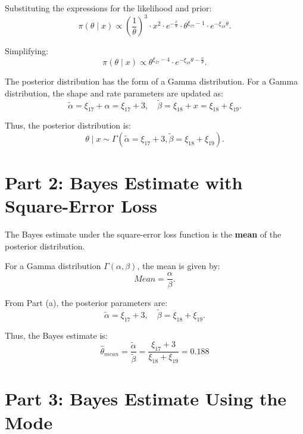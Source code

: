 Substituting the expressions for the likelihood and prior:
\begin{equation}
\pi(\theta \mid x) \propto \left(\frac{1}{\theta}\right)^3 \cdot x^2 \cdot e^{-\frac{x}{\theta}} \cdot \theta^{\xi_{17}-1} \cdot e^{-\xi_{18} \theta}.
\end{equation}

Simplifying:
\begin{equation}
\pi(\theta \mid x) \propto \theta^{\xi_{17} - 4} \cdot e^{-\xi_{18} \theta - \frac{x}{\theta}}.
\end{equation}

The posterior distribution has the form of a Gamma distribution. For a Gamma distribution, the shape and rate parameters are updated as:
\begin{equation}
\tilde{\alpha} = \xi_{17} + \alpha = \xi_{17} + 3, \quad
\tilde{\beta} = \xi_{18} + x = \xi_{18} + \xi_{19}.
\end{equation}

Thus, the posterior distribution is:
\begin{equation}
\theta \mid x \sim \Gamma(\tilde{\alpha} = \xi_{17} + 3, \tilde{\beta} = \xi_{18} + \xi_{19}).
\end{equation}

\section*{Part 2: Bayes Estimate with Square-Error Loss}

The Bayes estimate under the square-error loss function is the \textbf{mean} of the posterior distribution. 

For a Gamma distribution $ \Gamma(\alpha, \beta) $, the mean is given by:
\begin{equation}
Mean = \frac{\alpha}{\beta}.
\end{equation}

From Part (a), the posterior parameters are:
\begin{equation}
\tilde{\alpha} = \xi_{17} + 3, \quad \tilde{\beta} = \xi_{18} + \xi_{19}.
\end{equation}

Thus, the Bayes estimate is:
\begin{equation}
\hat{\theta}_{mean} = \frac{\tilde{\alpha}}{\tilde{\beta}} = \frac{\xi_{17} + 3}{\xi_{18} + \xi_{19}}=0.188
\end{equation}

\section{Part 3: Bayes Estimate Using the Mode}

